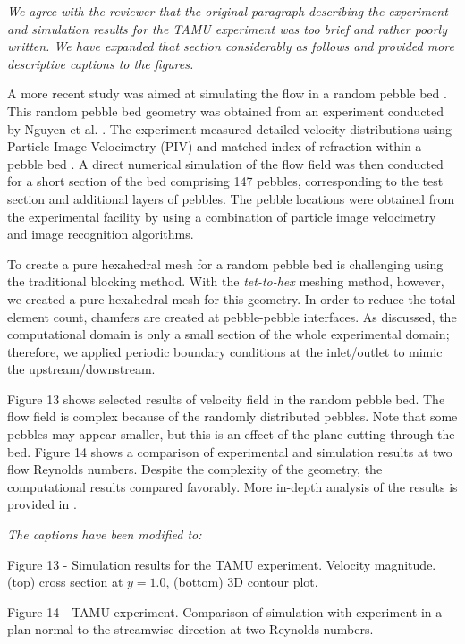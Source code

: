 \documentclass{nseJournal}
\begin{document}
\textit{We agree with the reviewer that the original paragraph describing the experiment and simulation results for the TAMU experiment was too brief and rather poorly written. We have expanded that section considerably as follows and provided more descriptive captions to the figures.}

A more recent study was aimed at simulating the flow in a random pebble bed \cite{yildiz2020direct}. This random pebble bed geometry was obtained from an experiment conducted by Nguyen et al. \cite{nguyen2018time}.  The experiment measured detailed velocity distributions using Particle Image Velocimetry (PIV) and matched index of refraction within a pebble bed . A direct numerical simulation of the flow field was then conducted for a short section of the bed comprising 147 pebbles, corresponding to the test section and additional layers of pebbles. The pebble locations were obtained from the experimental facility by using a combination of particle image velocimetry and image recognition algorithms.

To create a pure hexahedral mesh for a random pebble bed is challenging using the traditional blocking method. With the \textit{tet-to-hex} meshing method, however, we created a pure hexahedral mesh for this geometry. In order to reduce the total element count, chamfers are created at pebble-pebble interfaces. As discussed, the computational domain is only a small section of the whole experimental domain; therefore, we applied periodic boundary conditions at the inlet/outlet to mimic the upstream/downstream.

Figure 13 shows selected results of velocity field in the random pebble bed. The flow field is complex because of the randomly distributed pebbles. Note that some pebbles may appear smaller, but this is an effect of the plane cutting through the bed. Figure 14 shows a comparison of experimental and simulation results at two flow Reynolds numbers. Despite the complexity of the geometry, the computational results compared favorably. More in-depth analysis of the results is provided in \cite{yildiz2020direct}.

\textit{The captions have been modified to: }

Figure 13 - Simulation results for the TAMU experiment. Velocity magnitude. (top) cross section at $y=1.0$, (bottom) 3D contour plot.

Figure 14 - TAMU experiment. Comparison of simulation with experiment in a plan normal to the streamwise direction at two Reynolds numbers.
\end{document}
